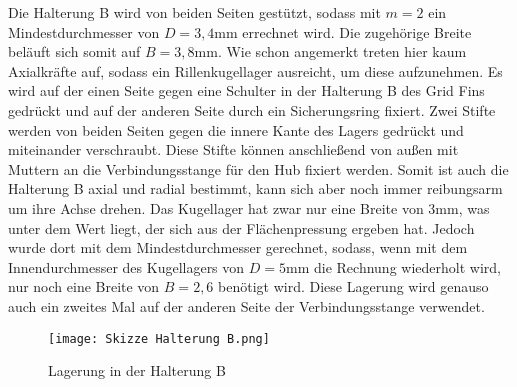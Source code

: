 Die Halterung B wird von beiden Seiten gestützt, sodass mit $m = 2$ ein Mindestdurchmesser von $D = 3,4$mm errechnet wird. Die zugehörige Breite beläuft sich somit auf $B = 3,8$mm. Wie schon angemerkt treten hier kaum Axialkräfte auf, sodass ein Rillenkugellager ausreicht, um diese aufzunehmen. Es wird auf der einen Seite gegen eine Schulter in der Halterung B des Grid Fins gedrückt und auf der anderen Seite durch ein Sicherungsring fixiert. Zwei Stifte werden von beiden Seiten gegen die innere Kante des Lagers gedrückt und miteinander verschraubt. Diese Stifte können anschließend von außen mit Muttern an die Verbindungsstange für den Hub fixiert werden. Somit ist auch die Halterung B axial und radial bestimmt, kann sich aber noch immer reibungsarm um ihre Achse drehen. Das Kugellager hat zwar nur eine Breite von 3mm, was unter dem Wert liegt, der sich aus der Flächenpressung ergeben hat. Jedoch wurde dort mit dem Mindestdurchmesser gerechnet, sodass, wenn mit dem Innendurchmesser des Kugellagers von $D = 5$mm die Rechnung wiederholt wird, nur noch eine Breite von $B =2,6$ benötigt wird. Diese Lagerung wird genauso auch ein zweites Mal auf der anderen Seite der Verbindungsstange verwendet.
\begin{figure}[h] 
	\centering
	\texttt{[image: Skizze Halterung B.png]}
	\caption{Lagerung in der Halterung B}
\end{figure}
